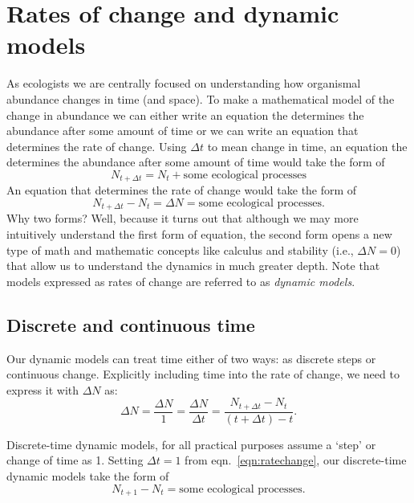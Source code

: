 \documentclass[11pt]{article}
\begin{document}
\section{Rates of change and dynamic models}
As ecologists we are centrally focused on understanding how organismal abundance changes in time (and space). To make a mathematical model of the change in abundance we can either write an equation the determines the abundance after some amount of time or we can write an equation that determines the rate of change. Using $\Delta t$ to mean change in time, an equation the determines the abundance after some amount of time would take the form of
    \begin{equation}
    N_{t + \Delta t} = N_t + \textrm{some ecological processes}
    \end{equation}
An equation that determines the rate of change would take the form of
    \begin{equation}
    N_{t + \Delta t} - N_t = \Delta N = \textrm{some ecological processes}.
    \end{equation}
Why two forms? Well, because it turns out that although we may more intuitively understand the first form of equation, the second form opens a new type of math and mathematic concepts like calculus and stability (i.e., $\Delta N = 0$) that allow us to understand the dynamics in much greater depth. Note that models expressed as rates of change are referred to as \emph{dynamic models}.

\subsection{Discrete and continuous time}
Our dynamic models can treat time either of two ways: as discrete steps or continuous change. Explicitly including time into the rate of change, we need to express it with $\Delta N$ as:
    \begin{equation}
    \Delta N = \frac{\Delta N}{1} = \frac{\Delta N}{\Delta t} = \frac{N_{t + \Delta t} - N_t}{(t + \Delta t) - t}.
    \label{eqn:ratechange}
    \end{equation}

Discrete-time dynamic models, for all practical purposes assume a `step' or change of time as 1. Setting $\Delta t = 1$ from eqn.~\ref{eqn:ratechange}, our discrete-time dynamic models take the form of
    \begin{equation}
    N_{t + 1} - N_t = \textrm{some ecological processes}.
    \end{equation}
\end{document}
